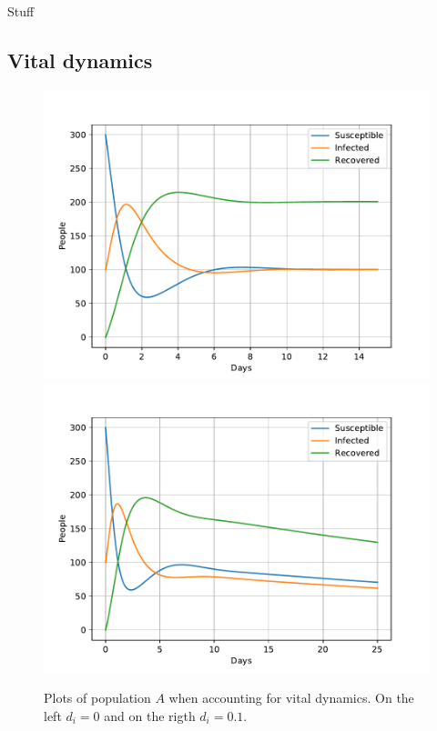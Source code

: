\documentclass[a4paper]{article}
\let\Oldsubsection\subsection
\renewcommand{\subsection}{\FloatBarrier\Oldsubsection}
\begin{document}
Stuff

\subsection{Vital dynamics}

\begin{figure}[!htb]
	\centering 
	\includegraphics[scale=0.56]{../plots/opp_c_A0.pdf}
	\includegraphics[scale=0.56]{../plots/opp_c_A1.pdf}
	\caption{Plots of population $A$ when accounting for vital dynamics. On the left $d_i=0$ and on the rigth $d_i=0.1$.}
	\label{opp_c0A}
\end{figure}
\end{document}
